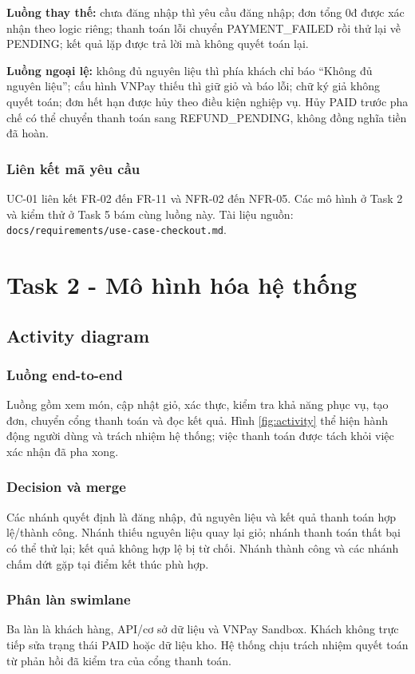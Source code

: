 \documentclass[12pt,a4paper]{article}
\newcommand{\tep}[1]{\nolinkurl{#1}}
\begin{document}
\textbf{Luồng thay thế:} chưa đăng nhập thì yêu cầu đăng nhập; đơn tổng 0đ được xác nhận theo logic riêng; thanh toán lỗi chuyển PAYMENT\_FAILED rồi thử lại về PENDING; kết quả lặp được trả lời mà không quyết toán lại.

\textbf{Luồng ngoại lệ:} không đủ nguyên liệu thì phía khách chỉ báo ``Không đủ nguyên liệu''; cấu hình VNPay thiếu thì giữ giỏ và báo lỗi; chữ ký giả không quyết toán; đơn hết hạn được hủy theo điều kiện nghiệp vụ. Hủy PAID trước pha chế có thể chuyển thanh toán sang REFUND\_PENDING, không đồng nghĩa tiền đã hoàn.

\subsubsection{Liên kết mã yêu cầu}
UC-01 liên kết FR-02 đến FR-11 và NFR-02 đến NFR-05. Các mô hình ở Task 2 và kiểm thử ở Task 5 bám cùng luồng này. Tài liệu nguồn: \tep{docs/requirements/use-case-checkout.md}.

\clearpage
\section{Task 2 - Mô hình hóa hệ thống}
\subsection{Activity diagram}
\subsubsection{Luồng end-to-end}
Luồng gồm xem món, cập nhật giỏ, xác thực, kiểm tra khả năng phục vụ, tạo đơn, chuyển cổng thanh toán và đọc kết quả. Hình \ref{fig:activity} thể hiện hành động người dùng và trách nhiệm hệ thống; việc thanh toán được tách khỏi việc xác nhận đã pha xong.

\subsubsection{Decision và merge}
Các nhánh quyết định là đăng nhập, đủ nguyên liệu và kết quả thanh toán hợp lệ/thành công. Nhánh thiếu nguyên liệu quay lại giỏ; nhánh thanh toán thất bại có thể thử lại; kết quả không hợp lệ bị từ chối. Nhánh thành công và các nhánh chấm dứt gặp tại điểm kết thúc phù hợp.

\subsubsection{Phân làn swimlane}
Ba làn là khách hàng, API/cơ sở dữ liệu và VNPay Sandbox. Khách không trực tiếp sửa trạng thái PAID hoặc dữ liệu kho. Hệ thống chịu trách nhiệm quyết toán từ phản hồi đã kiểm tra của cổng thanh toán.
\end{document}
